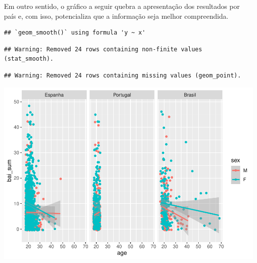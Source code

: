 \documentclass[
]{book}
\newenvironment{Shaded}{\begin{snugshade}}{\end{snugshade}}
\newcommand{\DataTypeTok}[1]{\textcolor[rgb]{0.13,0.29,0.53}{#1}}
\newcommand{\KeywordTok}[1]{\textcolor[rgb]{0.13,0.29,0.53}{\textbf{#1}}}
\newcommand{\NormalTok}[1]{#1}
\newcommand{\OperatorTok}[1]{\textcolor[rgb]{0.81,0.36,0.00}{\textbf{#1}}}
\newcommand{\StringTok}[1]{\textcolor[rgb]{0.31,0.60,0.02}{#1}}
\begin{document}
Em outro sentido, o gráfico a seguir quebra a apresentação dos resultados por país e, com isso, potencializa que a informação seja melhor compreendida.

\begin{Shaded}
\end{Shaded}

\begin{verbatim}
## `geom_smooth()` using formula 'y ~ x'
\end{verbatim}

\begin{verbatim}
## Warning: Removed 24 rows containing non-finite values (stat_smooth).
\end{verbatim}

\begin{verbatim}
## Warning: Removed 24 rows containing missing values (geom_point).
\end{verbatim}

\begin{center}\includegraphics{gitbook-demo_files/figure-latex/unnamed-chunk-28-1} \end{center}
\end{document}

